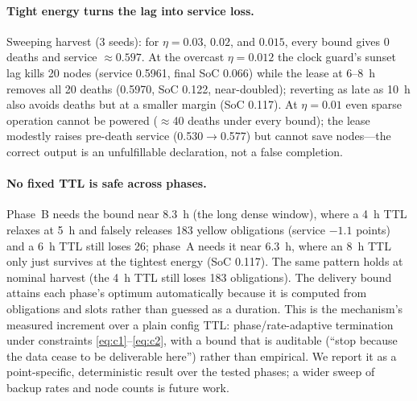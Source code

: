 \documentclass[11pt]{article}
\begin{document}
\paragraph{Tight energy turns the lag into service loss.}
Sweeping harvest (3 seeds): for $\eta=0.03$, $0.02$, and $0.015$, every bound gives 0 deaths and service
$\approx0.597$. At the overcast $\eta{=}0.012$ the clock guard's sunset lag kills 20 nodes
(service 0.5961, final SoC 0.066) while the lease at 6--8~h removes all 20 deaths (0.5970, SoC
0.122, near-doubled); reverting as late as 10~h also avoids deaths but at a smaller margin (SoC
0.117). At $\eta{=}0.01$ even sparse operation cannot be powered ($\approx$40 deaths under every
bound); the lease modestly raises pre-death service (0.530$\to$0.577) but cannot save nodes---the
correct output is an unfulfillable declaration, not a false completion.

\paragraph{No fixed TTL is safe across phases.}
Phase~B needs the bound near 8.3~h (the long dense window), where a 4~h TTL relaxes at 5~h and
falsely releases 183 yellow obligations (service $-1.1$ points) and a 6~h TTL still loses 26;
phase~A needs it near 6.3~h, where an 8~h TTL only just survives at the tightest energy (SoC 0.117).
The same pattern holds at nominal harvest (the 4~h TTL still loses 183 obligations). The delivery
bound attains each phase's optimum automatically because it is computed from obligations and slots
rather than guessed as a duration. This is the mechanism's measured increment over a plain
config TTL: phase/rate-adaptive termination under constraints \eqref{eq:c1}--\eqref{eq:c2}, with a
bound that is auditable (``stop because the data cease to be deliverable here'') rather than
empirical. We report it as a point-specific, deterministic result over the tested phases; a wider
sweep of backup rates and node counts is future work.
\end{document}
